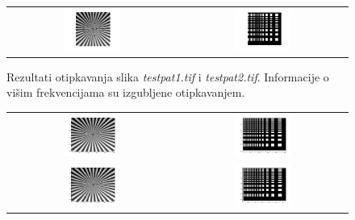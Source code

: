 \documentclass[12pt, a4]{report}
\begin{document}
\begin{enumerate}
\begin{figure}
\begin{tabular}{cc}
                        \includegraphics[width=0.35\textwidth]{testpat1S} & \includegraphics[width=0.35\textwidth]{testpat2S}
                    \end{tabular}
                    \caption{Rezultati otipkavanja slika {\it testpat1.tif} i {\it testpat2.tif}. Informacije o višim frekvencijama su izgubljene otipkavanjem.}    
                    \label{fig:sampling3}
                \end{figure}
                \begin{figure}
                    \centering
                    \begin{tabular}{cc}
                        \includegraphics[width=0.35\textwidth]{testpat1L} & \includegraphics[width=0.35\textwidth]{testpat2L} \\
                        \includegraphics[width=0.35\textwidth]{testpat1LS} & \includegraphics[width=0.35\textwidth]{testpat2LS}

\end{tabular}
\end{figure}
\end{enumerate}
\end{document}
